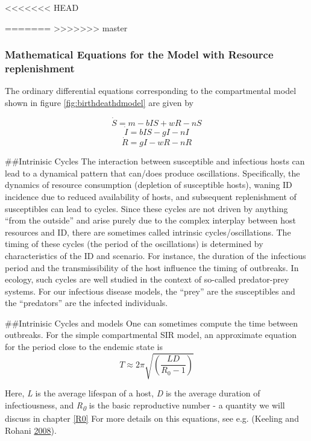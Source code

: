 \documentclass[]{book}
\theoremstyle{definition}
\theoremstyle{definition}
\theoremstyle{definition}
\theoremstyle{remark}
\begin{document}
<<<<<<< HEAD
\hypertarget{myadvancedbox}{%
=======
>>>>>>> master
\subsubsection{Mathematical Equations for the Model with Resource
replenishment}\label{myadvancedbox}}

The ordinary differential equations corresponding to the compartmental
model shown in figure \ref{fig:birthdeathdmodel} are given by

\[\dot S = m - b I S + wR - n S \] \[\dot I = b IS - gI - n I \]
\[\dot R =  gI - wR - n R\]

\#\#Intrinisic Cycles The interaction between susceptible and infectious
hosts can lead to a dynamical pattern that can/does produce
oscillations. Specifically, the dynamics of resource consumption
(depletion of susceptible hosts), waning ID incidence due to reduced
availability of hosts, and subsequent replenishment of susceptibles can
lead to cycles. Since these cycles are not driven by anything ``from the
outside'' and arise purely due to the complex interplay between host
resources and ID, there are sometimes called intrinsic
cycles/oscillations. The timing of these cycles (the period of the
oscillations) is determined by characteristics of the ID and scenario.
For instance, the duration of the infectious period and the
transmissibility of the host influence the timing of outbreaks. In
ecology, such cycles are well studied in the context of so-called
predator-prey systems. For our infectious disease models, the ``prey''
are the susceptibles and the ``predators'' are the infected individuals.

\#\#Intrinisic Cycles and models One can sometimes compute the time
between outbreaks. For the simple compartmental SIR model, an
approximate equation for the period close to the endemic state is
\[T \approx 2 \pi \sqrt{\left( \frac{LD}{R_0 - 1} \right)}\]

Here, \emph{L} is the average lifespan of a host, \emph{D} is the
average duration of infectiousness, and \emph{R\textsubscript{0}} is the
basic reproductive number - a quantity we will discuss in chapter
\ref{R0} For more details on this equations, see e.g. (Keeling and
Rohani \protect\hyperlink{ref-keeling08}{2008}).
\end{document}
